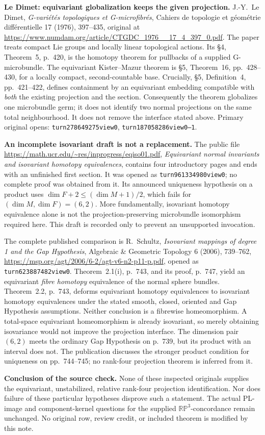 \textbf{Le Dimet: equivariant globalization keeps the given projection.}\quad
J.-Y.~Le Dimet, \emph{G-vari\'et\'es topologiques et G-microfibr\'es},
Cahiers de topologie et g\'eom\'etrie diff\'erentielle 17 (1976),
397--435, original at
\url{https://www.numdam.org/article/CTGDC_1976__17_4_397_0.pdf}.
The paper treats compact Lie groups and locally linear topological
actions.  Its \S4, Theorem~5, p.~420, is the homotopy theorem for
pullbacks of a supplied G-microbundle.  The equivariant Kister--Mazur
theorem is \S5, Theorem~16, pp.~428--430, for a locally compact,
second-countable base.  Crucially, \S5, Definition~4, pp.~421--422,
defines containment by an equivariant embedding compatible with
\emph{both} the existing projection and the section.  Consequently
the theorem globalizes one microbundle germ; it does not identify two
normal projections on the same total neighbourhood.  It does not
remove the interface stated above.  Primary original opens:
\texttt{turn278649275view0}, \texttt{turn187058286view0--1}.

\textbf{An incomplete isovariant draft is not a replacement.}\quad
The public file
\url{https://math.ucr.edu/~res/inprogress/eqiso01.pdf},
\emph{Equivariant normal invariants and isovariant homotopy
equivalences}, contains four introductory pages and ends with an
unfinished first section.  It was opened as
\texttt{turn961334980view0}; no complete proof was obtained from it.
Its announced uniqueness hypothesis on a product uses
\(\dim F+2\le(\dim M+1)/2\), which fails for \((\dim M,\dim F)=(6,2)\).
More fundamentally, isovariant homotopy equivalence alone is not the
projection-preserving microbundle isomorphism required here.  This
draft is recorded only to prevent an unsupported invocation.

The complete published comparison is R.~Schultz,
\emph{Isovariant mappings of degree 1 and the Gap Hypothesis},
Algebraic \& Geometric Topology 6 (2006), 739--762,
\url{https://msp.org/agt/2006/6-2/agt-v6-n2-p11-p.pdf},
opened as \texttt{turn623887482view0}.  Theorem~2.1(i), p.~743,
and its proof, p.~747, yield an equivariant \emph{fibre homotopy}
equivalence of the normal sphere bundles.  Theorem~2.2, p.~743,
deforms equivariant homotopy equivalences to isovariant homotopy
equivalences under the stated smooth, closed, oriented and Gap
Hypothesis assumptions.  Neither conclusion is a fibrewise
homeomorphism.  A total-space equivariant homeomorphism is already
isovariant, so merely obtaining isovariance would not improve the
projection interface.  The dimension pair \((6,2)\) meets the
ordinary Gap Hypothesis on p.~739, but its product with an interval
does not.  The publication discusses the stronger product condition
for uniqueness on pp.~744--745; no rank-four projection theorem is
inferred from it.

\textbf{Conclusion of the source check.}\quad
None of these inspected originals supplies the equivariant,
unstabilized, relative rank-four projection identification.  Nor does
failure of these particular hypotheses disprove such a statement.
The actual PL-image and component-kernel questions for the supplied
\(\mathbb{RP}^3\)-concordance remain unchanged.  No original row,
review credit, or included theorem is modified by this note.
